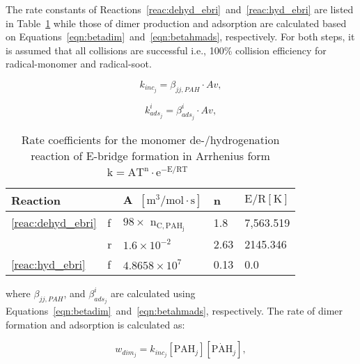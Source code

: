 

The rate constants of Reactions~\eqref{reac:dehyd_ebri}~and~\eqref{reac:hyd_ebri} are listed in Table~\ref{tab:Ebridge} while those of dimer production and adsorption are calculated based on Equations~\eqref{eqn:betadim}~and~\eqref{eqn:betahmads}, respectively. For both steps, it is assumed that all collisions are successful i.e., 100\% collision efficiency for radical-monomer and radical-soot.

\begin{equation}
	k_{inc_j}=
	\beta_{jj,PAH}\cdot Av
	\label{eqn:kdim_ebri},
\end{equation}

\begin{equation}
	k^i_{ads_{j}}=
	\beta^i_{ads_j}\cdot Av
	\label{eqn:kads_ebir},
\end{equation}

\renewcommand{\arraystretch}{1.5}
\begin{table}
	\caption{Rate coefficients for the monomer de-/hydrogenation reaction of E-bridge formation in Arrhenius form $\mathrm{k=AT^n\cdot e^{-E/RT}}$~\citep{frenklach2020mechanism}}
	\label{tab:Ebridge}
	\centering
	\begin{tabular}{l l l l l}
		\hline
		Reaction & \hspace{0.1cm} & A~$\mathrm{\left[{m^3}/{mol\cdot s} \right]}$ & n & $\mathrm{{E}/{R} [K]}$  \\
		\hline
		\eqref{reac:dehyd_ebri} & f & $98\times$ $\mathrm{n_{C, PAH_j}}$ & 1.8 & 7,563.519 \\
		  & r & $1.6\times 10^{-2}$ & 2.63 & 2145.346\\
		\eqref{reac:hyd_ebri} & f & $4.8658\times10^7
		$ & 0.13 & 0.0\\
		\hline
	\end{tabular}
\end{table}

\noindent where $\beta_{jj,PAH}$, and $\beta^i_{ads_j}$ are calculated using Equations~\eqref{eqn:betadim}~and~\eqref{eqn:betahmads}, respectively. The rate of dimer formation and adsorption is calculated as:

\begin{equation}
	w_{dim_j} = k_{inc_{j}} [\mathrm{PAH}_j] [\mathrm{\dot{PAH}}_j],
	\label{eqn:wdim_ebri}
\end{equation}

